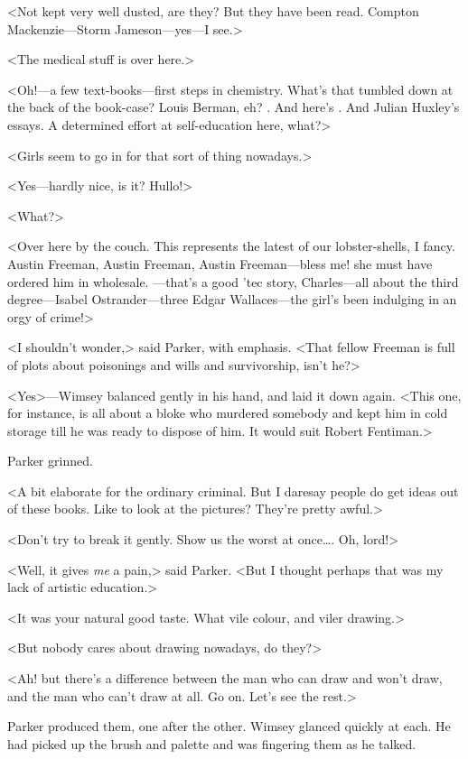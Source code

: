<Not kept very well dusted, are they? But they have been read. Compton Mackenzie—Storm Jameson—yes—I see.>

<The medical stuff is over here.>

<Oh!—a few text-books—first steps in chemistry. What's that tumbled down at the back of the book-case? Louis Berman, eh? . And here's . And Julian Huxley's essays. A determined effort at self-education here, what?>

<Girls seem to go in for that sort of thing nowadays.>

<Yes—hardly nice, is it? Hullo!>

<What?>

<Over here by the couch. This represents the latest of our lobster-shells, I fancy. Austin Freeman, Austin Freeman, Austin Freeman—bless me! she must have ordered him in wholesale. —that's a good 'tec story, Charles—all about the third degree—Isabel Ostrander—three Edgar Wallaces—the girl's been indulging in an orgy of crime!>

<I shouldn't wonder,> said Parker, with emphasis. <That fellow Freeman is full of plots about poisonings and wills and survivorship, isn't he?>

<Yes>—Wimsey balanced  gently in his hand, and laid it down again. <This one, for instance, is all about a bloke who murdered somebody and kept him in cold storage till he was ready to dispose of him. It would suit Robert Fentiman.>

Parker grinned.

<A bit elaborate for the ordinary criminal. But I daresay people do get ideas out of these books. Like to look at the pictures? They're pretty awful.>

<Don't try to break it gently. Show us the worst at once\dots. Oh, lord!>

<Well, it gives \emph{me} a pain,> said Parker. <But I thought perhaps that was my lack of artistic education.>

<It was your natural good taste. What vile colour, and viler drawing.>

<But nobody cares about drawing nowadays, do they?>

<Ah! but there's a difference between the man who can draw and won't draw, and the man who can't draw at all. Go on. Let's see the rest.>

Parker produced them, one after the other. Wimsey glanced quickly at each. He had picked up the brush and palette and was fingering them as he talked.

